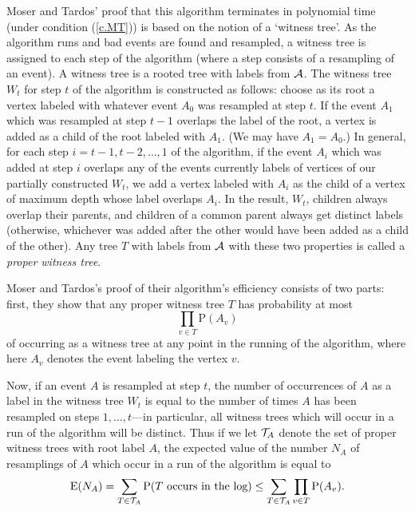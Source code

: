 \documentclass[letterpaper]{article}
\newcommand{\p}{\textrm{P}}
\newcommand{\e}{\textrm{E}}
\newcommand{\aaa}{{\cal A}}
\newcommand{\ttt}{{\cal T}}
\theoremstyle{definition}
\theoremstyle{remark}
\begin{document}
Moser and Tardos' proof that this algorithm terminates in polynomial time (under condition (\ref{c.MT})) is based on the notion of a `witness tree'.  As the algorithm runs and bad events are found and resampled, a witness tree is assigned to each step of the algorithm (where a step consists of a resampling of an event).  A witness tree is a rooted tree with labels from $\aaa$.  The witness tree $W_t$ for step $t$ of the algorithm is constructed as follows: choose as its root a vertex labeled with whatever event $A_0$ was resampled at step $t$.  If the event $A_1$ which was resampled at step $t-1$ overlaps the label of the root, a vertex is added as a child of the root labeled with $A_1$. (We may have $A_1=A_0$.)  In general, for each step $i=t-1,t-2,\dots,1$ of the algorithm, if the event $A_i$ which was added at step $i$ overlaps any of the events currently labels of vertices of our partially constructed $W_t$, we add a vertex labeled with $A_i$ as the child of a vertex of maximum depth whose label overlaps $A_i$.  In the result, $W_t$, children always overlap their parents, and children of a common parent always get distinct labels (otherwise, whichever was added after the other would have been added as a child of the other).  Any tree $T$ with labels from $\aaa$ with these two properties is called a \emph{proper witness tree}.

Moser and Tardos's proof of their algorithm's efficiency consists of two parts: first, they show that any proper witness tree $T$ has probability at most
\begin{equation}
\prod_{v\in T} \p(A_v)
\end{equation}
of occurring as a witness tree at any point in the running of the algorithm, where here $A_v$ denotes the event labeling the vertex $v$.

Now, if an event $A$ is resampled at step $t$, the number of occurrences of $A$ as a label in the witness tree $W_t$ is equal to the number of times $A$ has been resampled on steps $1,\dots,t$---in particular, all witness trees which will occur in a run of the algorithm will be distinct.  Thus if we let $\ttt_A$ denote the set of proper witness trees with root label $A$, the expected value of the number $N_A$ of resamplings of $A$ which occur in a run of the algorithm is equal to
\begin{equation}
\e(N_A)=\sum_{T\in \ttt_A} \p(T \textrm{ occurs in the log})\leq \sum_{T\in \ttt_A}\prod_{v\in T} \p(A_v).
\label{l.nasum}
\end{equation}
\end{document}
